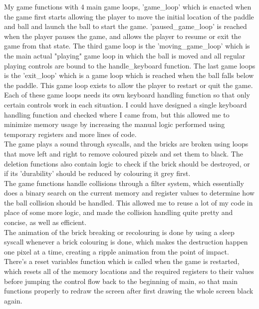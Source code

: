 \documentclass{article}
\begin{document}
My game functions with 4 main game loops, 'game\_loop' which is enacted when the game first starts allowing the player to move the initial location of the paddle and ball and launch the ball to start the game. 'paused\_game\_loop' is reached when the player pauses the game, and allows the player to resume or exit the game from that state. 
The third game loop is the 'moving\_game\_loop' which is the main actual "playing" game loop in which the ball is moved and all regular playing controls are bound to the handle\_keyboard function. The last game loops is the 'exit\_loop' which is a game loop which is reached when the ball falls below the paddle. This game loop exists to allow the player to restart or quit the game.
Each of these game loops needs its own keyboard handling function so that only certain controls work in each situation. I could have designed a single keyboard handling function and checked where I came from, but this allowed me to minimize memory usage by increasing the manual logic performed using temporary registers and more lines of code. \\
The game plays a sound through syscalls, and the bricks are broken using loops that move left and right to remove coloured pixels and set them to black. The deletion functions also contain logic to check if the brick should be destroyed, or if its 'durability' should be reduced by colouring it grey first. \\
The game functions handle collisions through a filter system, which essentially does a binary search on the current memory and register values to determine how the ball collision should be handled. This allowed me to reuse a lot of my code in place of some more logic, and made the collision handling quite pretty and concise, as well as efficient. \\
The animation of the brick breaking or recolouring is done by using a sleep syscall whenever a brick colouring is done, which makes the destruction happen one pixel at a time, creating a ripple animation from the point of impact. \\
There's a reset variables function which is called when the game is restarted, which resets all of the memory locations and the required registers to their values before jumping the control flow back to the beginning of main, so that main functions properly to redraw the screen after first drawing the whole screen black again. \\
\end{document}
